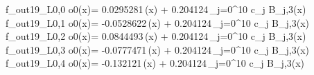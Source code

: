 f_{out19_L0,0	o0}(x)= 0.0295281\,\phi(x) + 0.204124\,\sum_{j=0}^{10} c_j B_{j,3}(x)
f_{out19_L0,1	o0}(x)= -0.0528622\,\phi(x) + 0.204124\,\sum_{j=0}^{10} c_j B_{j,3}(x)
f_{out19_L0,2	o0}(x)= 0.0844493\,\phi(x) + 0.204124\,\sum_{j=0}^{10} c_j B_{j,3}(x)
f_{out19_L0,3	o0}(x)= -0.0777471\,\phi(x) + 0.204124\,\sum_{j=0}^{10} c_j B_{j,3}(x)
f_{out19_L0,4	o0}(x)= -0.132121\,\phi(x) + 0.204124\,\sum_{j=0}^{10} c_j B_{j,3}(x)
